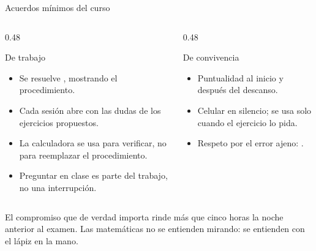 \documentclass[aspectratio=169,10pt]{beamer}
\begin{document}
\begin{frame}{Acuerdos mínimos del curso}
  \scriptsize
  \begin{columns}[T,onlytextwidth]
    \begin{column}{0.48\textwidth}
      \begin{block}{De trabajo}
        \tiny
        \begin{itemize}\setlength{\itemsep}{-0.04cm}
          \item Se resuelve , mostrando el procedimiento.
          \item Cada sesión abre con las dudas de los ejercicios propuestos.
          \item La calculadora se usa para verificar, no para reemplazar el
                procedimiento.
          \item Preguntar en clase es parte del trabajo, no una interrupción.
        \end{itemize}
      \end{block}
    \end{column}
    \begin{column}{0.48\textwidth}
      \begin{alertblock}{De convivencia}
        \tiny
        \begin{itemize}\setlength{\itemsep}{-0.04cm}
          \item Puntualidad al inicio y después del descanso.
          \item Celular en silencio; se usa solo cuando el ejercicio lo pida.
          \item Respeto por el error ajeno: .
        \end{itemize}
      \end{alertblock}
    \end{column}
  \end{columns}

  \vspace{0.1cm}
  \begin{exampleblock}{El compromiso que de verdad importa}
    \tiny
     rinde más que cinco horas la
    noche anterior al examen. Las matemáticas no se entienden mirando: se
    entienden con el lápiz en la mano.
  \end{exampleblock}
\end{frame}

\end{document}
